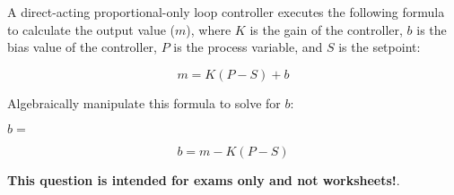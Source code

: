 

A direct-acting proportional-only loop controller executes the following formula to calculate the output value ($m$), where $K$ is the gain of the controller, $b$ is the bias value of the controller, $P$ is the process variable, and $S$ is the setpoint:

$$m = K(P - S) + b$$

Algebraically manipulate this formula to solve for $b$:

\vskip 20pt

$b = $







$$b = m - K(P - S)$$







{\bf This question is intended for exams only and not worksheets!}.




